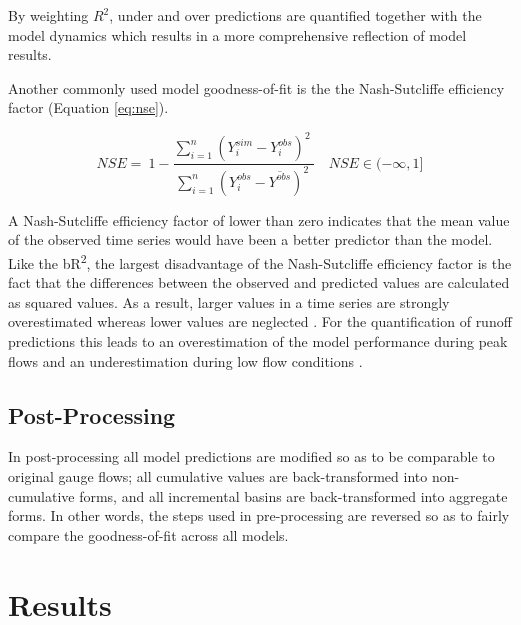 By weighting $R^2$, under and over predictions are quantified together with the model dynamics which results in a more comprehensive reflection of model results.

Another commonly used model goodness-of-fit is the the Nash-Sutcliffe efficiency factor (Equation \ref{eq:nse}). 

\begin{equation} \label{eq2:nse}
	NSE =\ 1-\frac{\sum^n_{i=1}{{\left(Y^{sim}_i-Y^{obs}_i\right)}^2\ }}{\sum^n_{i=1}{{\left(Y^{obs}_i-\overline{Y^{obs}}\right)}^2\ }} \quad NSE \in (-\infty,1] 
\end{equation}

A Nash-Sutcliffe efficiency factor of lower than zero indicates that the mean value of the observed time series would have been a better predictor than the model. Like the bR\textsuperscript{2}, the largest disadvantage of the Nash-Sutcliffe efficiency factor is the fact that the differences between the observed and predicted values are calculated as squared values. As a result, larger values in a time series are strongly overestimated whereas lower values are neglected \cite{legates1999evaluating}. For the quantification of runoff predictions this leads to an overestimation of the model performance during peak flows and an underestimation during low flow conditions \cite{krause2005comparison}.

\subsection{Post-Processing}
In post-processing all model predictions are modified so as to be comparable to original gauge flows; all cumulative values are back-transformed into non-cumulative forms, and all incremental basins are back-transformed into aggregate forms. In other words, the steps used in pre-processing are reversed so as to fairly compare the goodness-of-fit across all models.

\section{Results}

